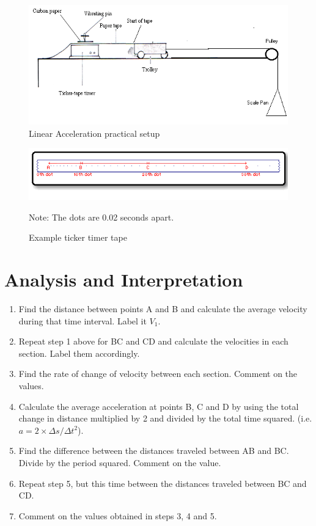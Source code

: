 \begin{figure}[h!]
\centering
\includegraphics[width=14cm]{./img/linear-acceleration-1.png}
\caption{Linear Acceleration practical setup}
\label{fig:linear-acceleration-1}
\end{figure}

\begin{figure}[h!]
\centering
\includegraphics[width=14cm]{./img/linear-acceleration-2.png}
\caption{Example ticker timer tape}
Note: The dots are 0.02 seconds apart.
\label{fig:linear-acceleration-2}
\end{figure}

\section{Analysis and Interpretation}
\begin{enumerate}
\item Find the distance between points A and B and calculate the average velocity during that time interval. Label it $V_1$. 
\item Repeat step 1 above for BC and CD and calculate the velocities in each section. Label them accordingly. 
\item Find the rate of change of velocity between each section. Comment on the values.
\item Calculate the average acceleration at points B, C and D by using the total change in distance multiplied by 2 and divided by the total time squared. (i.e. $a=2\times \Delta s\slash \Delta t^2$).
\item Find the difference between the distances traveled between AB and BC. Divide by the period squared. Comment on the value. 
\item Repeat step 5, but this time between the distances traveled between BC and CD.
\item Comment on the values obtained in steps 3, 4 and 5.
\end{enumerate}

